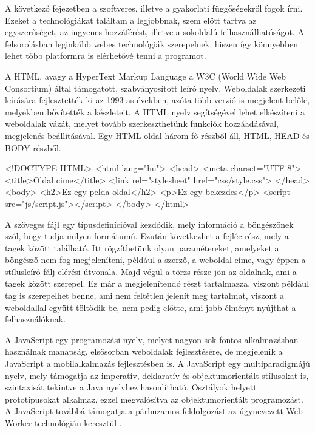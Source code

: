 A következő fejezetben a szoftveres, illetve a gyakorlati függőségekről fogok írni. Ezeket a technológiákat találtam a legjobbnak, szem előtt tartva az egyszerűséget, az ingyenes hozzáférést, illetve a sokoldalú felhasználhatóságot. A felsorolásban leginkább webes technológiák szerepelnek, hiszen így könnyebben lehet több platformra is elérhetővé tenni a programot.



A HTML, avagy a HyperText Markup Language a W3C (World Wide Web Consortium) által támogatott, szabványosított leíró nyelv. Weboldalak szerkezeti leírására fejlesztették ki az 1993-as években, azóta több verzió is megjelent belőle, melyekben bővítették a készleteit. A HTML nyelv segítségével lehet elkészíteni a weboldalak vázát, melyet tovább szerkeszthetünk funkciók hozzáadásával, megjelenés beállításával. Egy HTML oldal három fő részből áll, HTML, HEAD és BODY részből.

\begin{HTML5}
<!DOCTYPE HTML>
<html lang="hu">
    <head>
        <meta charset="UTF-8">
        <title>Oldal cime</title>
        <link rel="stylesheet" href="css/style.css">
    </head>
    <body>
        <h2>Ez egy pelda oldal</h2>
        <p>Ez egy bekezdes</p>
        <script src="js/script.js"></script>
    </body>
</html>
\end{HTML5}

\noindent A szöveges fájl egy típusdefinícióval kezdődik, mely információ a böngészőnek szól, hogy tudja milyen formátumú. Ezután következhet a fejléc rész, mely a  tagek között található. Itt rögzíthetünk olyan paramétereket, amelyeket a böngésző nem fog megjeleníteni, például a szerző, a weboldal címe, vagy éppen a stílusleíró fálj elérési útvonala. Majd végül a törzs része jön az oldalnak, ami a  tagek között szerepel. Ez már a megjelenítendő részt tartalmazza, viszont például  tag is szerepelhet benne, ami nem feltétlen jelenít meg tartalmat, viszont a weboldallal együtt töltődik be, nem pedig előtte, ami jobb élményt nyújthat a felhasználóknak.


A JavaScript egy programozási nyelv, melyet nagyon sok fontos alkalmazásban használnak manapság, elsősorban weboldalak fejlesztésére, de megjelenik a JavaScript a mobilalkalmazás fejlesztésben is. A JavaScript egy multiparadigmájú nyelv, mely támogatja az imperatív, deklaratív és objektumorientált stílusokat is, szintaxisát tekintve a Java nyelvhez hasonlítható. Osztályok helyett prototípusokat alkalmaz, ezzel megvalósítva az objektumorientált programozást. A JavaScript továbbá támogatja a párhuzamos feldolgozást az úgynevezett Web Worker technológián keresztül \cite{webworker}.


